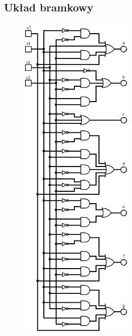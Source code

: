 \documentclass[]{article}
\begin{document}
\subsection{Układ bramkowy}
\begin{figure}[H]
	\centering
	\includegraphics[width=0.5\textwidth]{uklad_bramkowy.png}
\end{figure}
\end{document}
